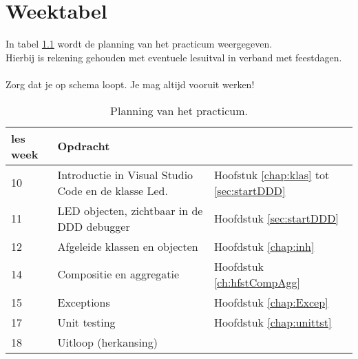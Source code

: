 \chapter{Weektabel}

In tabel \ref{tabel:wkplan} wordt de planning van het practicum weergegeven.\\
Hierbij is rekening gehouden met eventuele lesuitval in verband met feestdagen.\\~\\
Zorg dat je op schema loopt. Je mag altijd vooruit werken!
\begin{table}[h!]
	\begin{tabular}{ | m{1.8em} | m{7cm} |l| } 
		\hline
les week &Opdracht &  \\ \hline
	10	& Introductie in Visual Studio Code en de klasse Led. & Hoofstuk \ref{chap:klas} tot \ref{sec:startDDD} \\ \hline
	11	&   LED objecten, zichtbaar in de DDD debugger &  Hoofdstuk \ref{sec:startDDD} \\ \hline
	12	&  Afgeleide klassen en objecten & Hoofdstuk \ref{chap:inh} \\ \hline
	14	&Compositie en aggregatie    & Hoofdstuk \ref{ch:hfstCompAgg} \\ \hline
	15	& Exceptions   & Hoofdstuk \ref{chap:Excep} \\ \hline
	17	&Unit testing  & Hoofdstuk \ref{chap:unittst} \\ \hline	
	18 &Uitloop (herkansing)&\\ \hline
	\end{tabular}  
    \caption{Planning van het practicum.}
    \label{tabel:wkplan}
\end{table}


